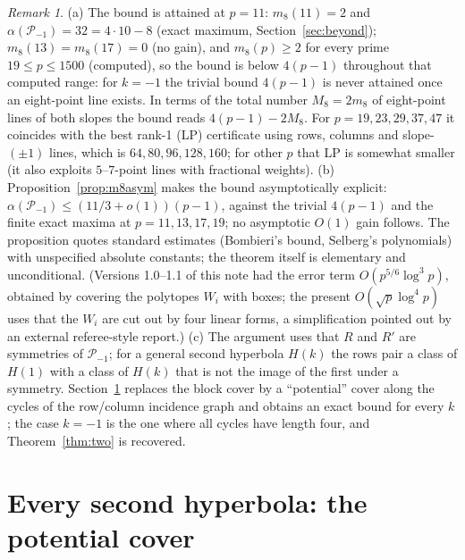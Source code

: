 \documentclass[11pt]{article}
\theoremstyle{remark}
\newtheorem{remark}[theorem]{Remark}
\newcommand{\Pset}{\mathcal{P}}
\begin{document}
\begin{remark}
(a) The bound is attained at $p=11$: $m_8(11)=2$ and $\alpha(\Pset_{-1})=32=4\cdot10-8$ (exact maximum, Section~\ref{sec:beyond});
$m_8(13)=m_8(17)=0$ (no gain), and $m_8(p)\ge2$ for every prime $19\le p\le1500$ (computed), so the bound is below $4(p-1)$ throughout that computed range: for $k=-1$ the trivial bound $4(p-1)$ is never attained once an eight-point line exists.  In terms of the total number
$M_8=2m_8$ of eight-point lines of both slopes the bound reads $4(p-1)-2M_8$.  For $p=19,23,29,37,47$ it coincides with the best rank-1 (LP) certificate using rows, columns and slope-$(\pm1)$ lines,
which is $64,80,96,128,160$; for other $p$ that LP is somewhat smaller (it also exploits $5$--$7$-point lines with fractional weights).
(b) Proposition~\ref{prop:m8asym} makes the bound asymptotically explicit: $\alpha(\Pset_{-1})\le(11/3+o(1))(p-1)$, against the
trivial $4(p-1)$ and the finite exact maxima at $p=11,13,17,19$; no asymptotic $O(1)$ gain follows.  The proposition quotes standard estimates (Bombieri's bound, Selberg's
polynomials) with unspecified absolute constants; the theorem itself is elementary and unconditional.  (Versions 1.0--1.1 of this note
had the error term $O(p^{5/6}\log^3p)$, obtained by covering the polytopes $W_i$ with boxes; the present $O(\sqrt p\log^4p)$ uses that
the $W_i$ are cut out by four linear forms, a simplification pointed out by an external referee-style report.)
(c) The argument uses that $R$ and $R'$ are symmetries of $\Pset_{-1}$; for a general second hyperbola $H(k)$ the rows pair a class of
$H(1)$ with a class of $H(k)$ that is not the image of the first under a symmetry.  Section~\ref{sec:general} replaces the block cover by a
``potential'' cover along the cycles of the row/column incidence graph and obtains an exact bound for every $k$; the case $k=-1$ is the one
where all cycles have length four, and Theorem~\ref{thm:two} is recovered.
\end{remark}






\section{Every second hyperbola: the potential cover}\label{sec:general}
\end{document}
